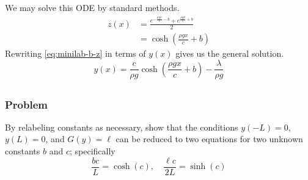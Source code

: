 \documentclass[12pt,twoside]{article}
\begin{document}
We may solve this ODE by standard methods.
\begin{equation}
  \label{eq:minilab-b-z}
  \begin{aligned}
    z(x) &= \frac{e^{-\frac{\rho g x}{c}-b} + e^{\frac{\rho g x}{c}+b}}{2} \\
    &= \cosh\left(\frac{\rho g x}{c} + b\right)
  \end{aligned}
\end{equation}
Rewriting \cref{eq:minilab-b-z} in terms of $y(x)$ gives us the general
solution.
\begin{equation*}
  \boxed{y(x) = \frac{c}{\rho g}\cosh\left(\frac{\rho g x}{c}+b\right) - \frac{\lambda}{\rho g}}
\end{equation*}

\subsection{}
\subsubsection*{Problem}
By relabeling constants as necessary, show that the conditions $y(-L)=0$,
$y(L)=0$, and $G(y)=\ell$ can be reduced to two equations for two unknown
constants $b$ and $c$; specifically
\begin{equation}
  \label{eq:minilab-b-problem}
  \frac{bc}{L}=\cosh(c),\quad \frac{\ell c}{2L}=\sinh(c)
\end{equation}
\end{document}
